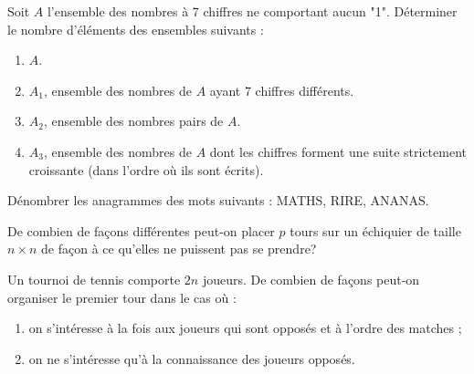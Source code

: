 \documentclass[../PolyS4.tex]{subfiles}
\begin{document}




Soit $A$ l'ensemble des nombres à 7 chiffres ne comportant aucun "1". Déterminer le nombre d'éléments des ensembles suivants :
\begin{enumerate}
\item $A$.
\item $A_1$, ensemble des nombres de $A$ ayant 7 chiffres différents.
\item $A_2$, ensemble des nombres pairs de $A$.
\item $A_3$, ensemble des nombres de $A$ dont les chiffres forment une suite strictement croissante (dans l'ordre où ils sont écrits).\\
\end{enumerate}





Dénombrer les anagrammes des mots suivants : MATHS, RIRE, ANANAS.\\





De combien de façons différentes peut-on placer $p$ tours sur un échiquier de taille $n\times n$ de façon à
ce qu'elles ne puissent pas se prendre?\\


\newpage

\vskip0.2cm
Un tournoi de tennis comporte $2n$ joueurs. De combien de façons peut-on organiser le premier tour dans le cas où :
\begin{enumerate}
\item on s'intéresse à la fois aux joueurs qui sont opposés et à l'ordre des matches ;
\item on ne s'intéresse qu'à la connaissance des joueurs opposés.\\
\end{enumerate}
\end{document}
